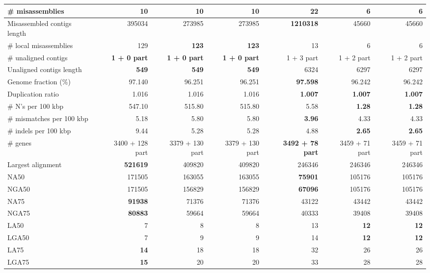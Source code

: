 \documentclass[12pt,a4paper]{article}
\begin{document}
\begin{table}[ht]
\begin{center}
\begin{tabular}{|l*{6}{|r}|}
\# misassemblies & {\bf 10} & {\bf 10} & {\bf 10} & 22 & 6 & 6 \\ \hline
Misassembled contigs length & 395034 & 273985 & 273985 & {\bf 1210318} & 45660 & 45660 \\ \hline
\# local misassemblies & 129 & {\bf 123} & {\bf 123} & 13 & 6 & 6 \\ \hline
\# unaligned contigs & {\bf 1 + 0 part} & {\bf 1 + 0 part} & {\bf 1 + 0 part} & 1 + 3 part & 1 + 2 part & 1 + 2 part \\ \hline
Unaligned contigs length & {\bf 549} & {\bf 549} & {\bf 549} & 6324 & 6297 & 6297 \\ \hline
Genome fraction (\%) & 97.140 & 96.251 & 96.251 & {\bf 97.598} & 96.242 & 96.242 \\ \hline
Duplication ratio & 1.016 & 1.016 & 1.016 & {\bf 1.007} & {\bf 1.007} & {\bf 1.007} \\ \hline
\# N's per 100 kbp & 547.10 & 515.80 & 515.80 & 5.58 & {\bf 1.28} & {\bf 1.28} \\ \hline
\# mismatches per 100 kbp & 5.18 & 5.80 & 5.80 & {\bf 3.96} & 4.33 & 4.33 \\ \hline
\# indels per 100 kbp & 9.44 & 5.28 & 5.28 & 4.88 & {\bf 2.65} & {\bf 2.65} \\ \hline
\# genes & 3400 + 128 part & 3379 + 130 part & 3379 + 130 part & {\bf 3492 + 78 part} & 3459 + 71 part & 3459 + 71 part \\ \hline
Largest alignment & {\bf 521619} & 409820 & 409820 & 246346 & 246346 & 246346 \\ \hline
NA50 & 171505 & 163055 & 163055 & {\bf 75901} & 105176 & 105176 \\ \hline
NGA50 & 171505 & 156829 & 156829 & {\bf 67096} & 105176 & 105176 \\ \hline
NA75 & {\bf 91938} & 71376 & 71376 & 43122 & 43442 & 43442 \\ \hline
NGA75 & {\bf 80883} & 59664 & 59664 & 40333 & 39408 & 39408 \\ \hline
LA50 & 7 & 8 & 8 & 13 & {\bf 12} & {\bf 12} \\ \hline
LGA50 & 7 & 9 & 9 & 14 & {\bf 12} & {\bf 12} \\ \hline
LA75 & {\bf 14} & 18 & 18 & 32 & 26 & 26 \\ \hline
LGA75 & {\bf 15} & 20 & 20 & 33 & 28 & 28 \\ \hline
\end{tabular}
\end{center}
\end{table}
\end{document}
